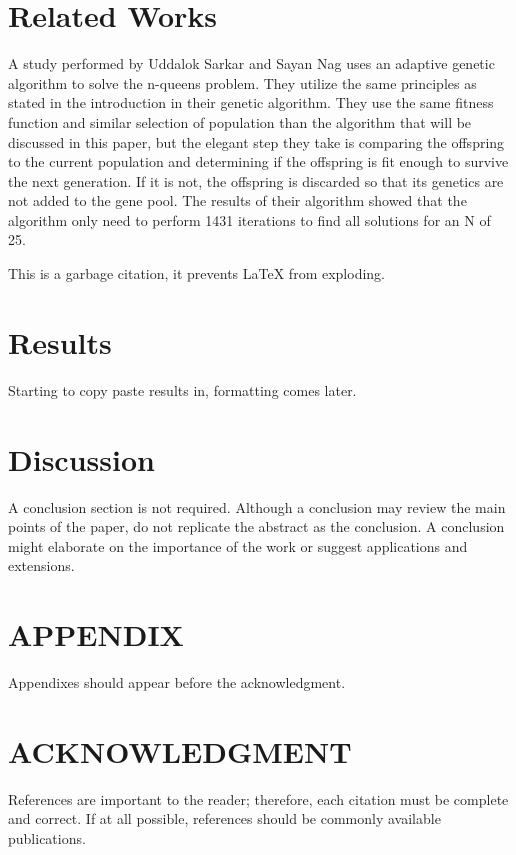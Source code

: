 \documentclass{vgtc}                          %
\begin{document}
\section{Related Works}
A study performed by Uddalok Sarkar and Sayan Nag uses an adaptive genetic algorithm to solve the n-queens problem. They utilize the same principles as stated in the introduction in their genetic algorithm. They use the same fitness function and similar selection of population than the algorithm that will be discussed in this paper, but the elegant step they take is comparing the offspring to the current population and determining if the offspring is fit enough to survive the next generation. If it is not, the offspring is discarded so that its genetics are not added to the gene pool. The results of their algorithm showed that the algorithm only need to perform 1431 iterations to find all solutions for an N of 25. 

\cite{Sarkar2017} This is a garbage citation, it prevents LaTeX from exploding.

\section{Results}

Starting to copy paste results in, formatting comes later.




\section{Discussion}

A conclusion section is not required. Although a conclusion may review the main points of the paper, do not replicate the abstract as the conclusion. A conclusion might elaborate on the importance of the work or suggest applications and extensions. 

\section*{APPENDIX}

Appendixes should appear before the acknowledgment.

\section*{ACKNOWLEDGMENT}




References are important to the reader; therefore, each citation must be complete and correct. If at all possible, references should be commonly available publications.



\end{document}
